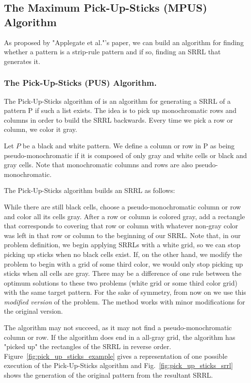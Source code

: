 \subsection{The Maximum Pick-Up-Sticks (MPUS) Algorithm}

As proposed by "Applegate et al."'s paper, we can build an algorithm for finding whether a pattern is a strip-rule pattern and if so, finding an SRRL that generates it.

\subsubsection{The Pick-Up-Sticks (PUS) Algorithm.}

The Pick-Up-Sticks algorithm of \cite{ACJKLW07}
 is an algorithm for generating a SRRL of a pattern P if such a list exists. The idea is to pick up monochromatic rows and columns in order to build the SRRL backwards. Every time we pick a row or column, we color it gray.

Let $P$ be a black and white pattern. We define a column or row in P as being pseudo-monochromatic if it is composed of only gray and white cells or black and gray cells. Note that monochromatic columns and rows are also pseudo-monochromatic.

The Pick-Up-Sticks algorithm builds an SRRL as follows:

While there are still
black cells, choose a pseudo-monochromatic column or row and color all its cells gray. After a row or column is colored gray, add a rectangle that corresponds to covering that row or column with whatever non-gray color was left in that row or column to the beginning of our SRRL.
Note that, in our problem definition,
 we begin applying SRRLs with a white grid, so we can stop
picking up sticks when no black cells exist.
If, on the other hand, we modify the problem to begin with a grid of some
third color, we would only stop picking up sticks when all cells are gray.
There may be a difference of one rule between the optimum solutions to these two
problems (white grid or some third color grid) with the same target pattern.
For the sake of symmetry, from now on we use this {\em modified version}
of the problem. The method works with minor modifications for
the original version.

The algorithm may not succeed,
as it may not find a pseudo-monochromatic column or row.
If the algorithm does end in a all-gray grid,
the algorithm has "picked up" the rectangles of the SRRL in reverse order. Figure~\ref{fig:pick_up_sticks_example} gives a representation of one possible execution of the Pick-Up-Sticks algorithm and Fig.~\ref{fig:pick_up_sticks_srrl} shows the generation of the original pattern from the resultant SRRL.

